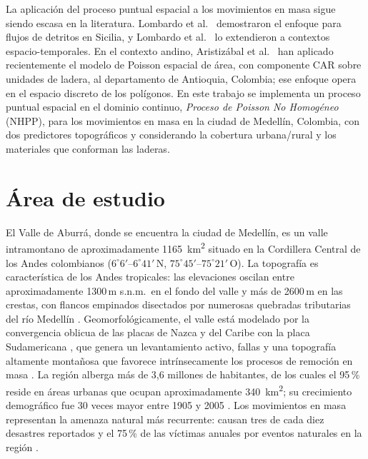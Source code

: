 \documentclass[10pt, twocolumn, letterpaper]{article}
\begin{document}
La aplicación del proceso puntual espacial a los movimientos en masa sigue
siendo escasa en la literatura. Lombardo et al.\ \cite{lombardo2019}
demostraron el enfoque para flujos de detritos en Sicilia, y
Lombardo et al.\ \cite{lombardo2020} lo extendieron a contextos
espacio-temporales. En el contexto andino, Aristizábal et al.\
\cite{aristizabal2025ag} han aplicado recientemente el modelo de Poisson
espacial de área, con componente CAR sobre unidades de ladera, al departamento
de Antioquia, Colombia; ese enfoque opera en el espacio discreto de los
polígonos. En este trabajo se implementa un proceso puntual espacial en el
dominio continuo, \emph{Proceso de Poisson No Homogéneo} (NHPP), para los
movimientos en masa en la ciudad de Medellín, Colombia, con dos predictores
topográficos y considerando la cobertura urbana/rural y los materiales que
conforman las laderas.

\section{Área de estudio}
\label{sec:study_area}

El Valle de Aburrá, donde se encuentra la ciudad de Medellín, es un valle
intramontano de aproximadamente \SI{1165}{km^2} situado en la Cordillera Central
de los Andes colombianos ($6^\circ6'$--$6^\circ41'$\,N,
$75^\circ45'$--$75^\circ21'$\,O). La topografía es característica de los Andes
tropicales: las elevaciones oscilan entre aproximadamente 1300\,m s.n.m.\ en el
fondo del valle y más de 2600\,m en las crestas, con flancos empinados
disectados por numerosas quebradas tributarias del río Medellín
\cite{aristizabal2026}. Geomorfológicamente, el valle está modelado por la
convergencia oblicua de las placas de Nazca y del Caribe con la placa
Sudamericana \cite{trenkamp2002, cediel2003}, que genera un levantamiento
activo, fallas y una topografía altamente montañosa que favorece
intrínsecamente los procesos de remoción en masa \cite{aristizabal2025}. La
región alberga más de 3,6 millones de habitantes, de los cuales el
95\,\% reside en áreas urbanas que ocupan aproximadamente \SI{340}{km^2}; su
crecimiento demográfico fue 30 veces mayor entre 1905 y 2005
\cite{aristizabal2026}. Los movimientos en masa representan la amenaza natural
más recurrente: causan tres de cada diez desastres reportados y el
75\,\% de las víctimas anuales por eventos naturales en la región
\cite{gomez2023}.
\end{document}
